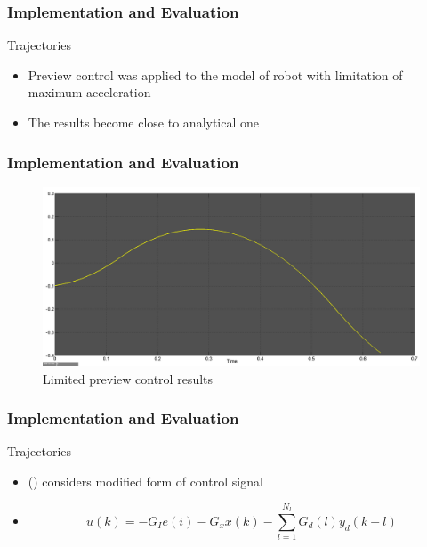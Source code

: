 \documentclass{beamer}
\begin{document}

	\begin{frame}
		\frametitle{Implementation and Evaluation}
		\begin{block}{Trajectories}
			\begin{itemize}
				\item
					Preview control was applied to the model of robot with limitation of maximum acceleration
				\item
					The results become close to analytical one
			\end{itemize}
		\end{block}
	\end{frame}
	

	\begin{frame}
		\frametitle{Implementation and Evaluation}
		\begin{figure}[h!]
			\centering
			\includegraphics[width=0.8\linewidth]{presentation_images/29}
			\caption{Limited preview control results}
		\end{figure}
	\end{frame}
	

	\begin{frame}
		\frametitle{Implementation and Evaluation}
		\begin{block}{Trajectories}
			\begin{itemize}
				\item
					(\cite{choi2006fuzzy}) considers modified form of control signal
				\item
					\begin{equation}
						u(k) = -G_I e(i) - G_xx(k) - \sum^{N_l}_{l=1}G_d(l)y_d(k+l)
					\end{equation}
			\end{itemize}
		\end{block}
	\end{frame}
	
\end{document}
